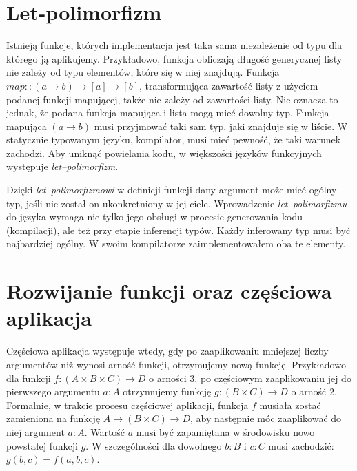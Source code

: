 \documentclass[declaration,shortabstract]{iithesis}
\begin{document}

\section{Let-polimorfizm}

Istnieją funkcje, których implementacja jest taka sama niezależenie od typu dla
którego ją aplikujemy. Przykładowo, funkcja obliczają długość generycznej 
listy nie zależy od typu elementów, które się w niej znajdują. 
Funkcja $map :: (a \rightarrow b) \rightarrow [a] \rightarrow [b]$, 
transformująca zawartość listy 
z użyciem podanej funkcji mapującej, także nie zależy od zawartości listy. Nie 
oznacza to jednak, że podana funkcja mapująca i lista mogą mieć dowolny typ. 
Funkcja mapująca $(a \rightarrow b)$ musi przyjmować taki sam typ, jaki 
znajduje się w liście. W statycznie typowanym języku, kompilator, musi mieć 
pewność, że taki warunek zachodzi. Aby uniknąć powielania kodu, w większości 
języków funkcyjnych 
występuje \textit{let--polimorfizm}. 

Dzięki \textit{let--polimorfizmowi} w definicji funkcji dany argument może 
mieć ogólny typ, jeśli nie został on ukonkretniony w jej ciele.
Wprowadzenie \textit{let--polimorfizmu} do języka wymaga nie tylko jego obsługi 
w procesie generowania kodu (kompilacji), ale też przy etapie inferencji typów.
Każdy inferowany typ musi być najbardziej ogólny. W swoim kompilatorze 
zaimplementowałem oba te elementy. 


\section{Rozwijanie funkcji oraz częściowa aplikacja}

Częściowa aplikacja występuje wtedy, gdy po zaaplikowaniu mniejszej liczby 
argumentów niż wynosi arność funkcji, otrzymujemy nową funkcję. Przykładowo 
dla funkcji $f: (A \times B \times C) \rightarrow D$ o arności $3$,
po częściowym zaaplikowaniu jej do pierwszego 
argumentu $a : A$ otrzymujemy funkcję $g : (B \times C) \rightarrow D$ o arność $2$.
Formalnie, w trakcie procesu częściowej aplikacji,
funkcja $f$ musiała zostać zamieniona na funkcję 
$A \rightarrow (B \times C) \rightarrow D$, aby następnie móc zaaplikować do niej 
argument $a : A$. Wartość $a$ musi być zapamiętana w środowisku nowo powstałej 
funkcji $g$.
W szczególności
dla dowolnego $b : B$ i $c : C$  musi zachodzić: $g(b, c) = f(a, b, c)$. 
\end{document}
